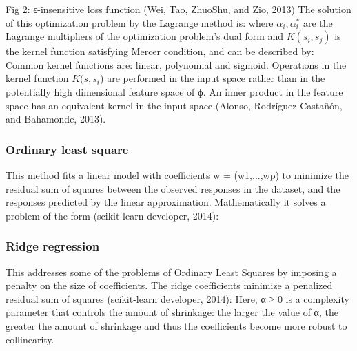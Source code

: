 \documentclass[review]{elsarticle}
\begin{document}
Fig 2: є-insensitive loss function (Wei, Tao, ZhuoShu, and Zio, 2013)
The solution of this optimization problem by the Lagrange method is:
where $α_i,α_i^*$  are the Lagrange multipliers of the optimization problem’s dual form and $K(s_i,s_j )$ is the kernel function satisfying Mercer condition, and can be described by:
Common kernel functions are: linear, polynomial and sigmoid.
Operations in the kernel function $K(s,s_i $) are performed in the input space rather than in the potentially high dimensional feature space of $ɸ$. An inner product in the feature space has an equivalent kernel in the input space (Alonso, Rodríguez Castañón, and Bahamonde, 2013).

\subsubsection{Ordinary least square}
This method fits a linear model with coefficients w = (w1,...,wp) to minimize the residual sum of squares between the observed responses in the dataset, and the responses predicted by the linear approximation. Mathematically it solves a problem of the form (scikit-learn developer, 2014):

\subsubsection{Ridge regression}

This addresses some of the problems of Ordinary Least Squares by imposing a penalty on the size of coefficients. The ridge coefficients minimize a penalized residual sum of squares (scikit-learn developer, 2014):
Here, α ˃ 0 is a complexity parameter that controls the amount of shrinkage: the larger the value of α, the greater the amount of shrinkage and thus the coefficients become more robust to collinearity.
\end{document}
